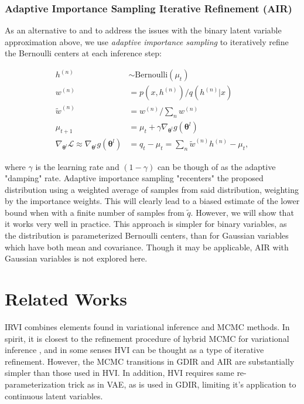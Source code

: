 \documentclass{article} %
\newcommand{\vects}[1]{\boldsymbol{#1}}
\newcommand{\TT}[0]{\vects{\theta}}
\newcommand{\grad}[0]{\nabla}
\newcommand{\LL}[0]{\mathcal{L}}
\newcommand{\Bernoulli}{\text{Bernoulli}}
\begin{document}
\subsubsection{Adaptive Importance Sampling Iterative Refinement (AIR)}
As an alternative to and to address the issues with the binary latent variable approximation above, we use \emph{adaptive importance sampling} \citep[AdIS,][]{karamchandani1989adaptive} to iteratively refine the Bernoulli centers at each inference step:

\begin{align}
    h^{(n)} &\sim \Bernoulli(\mu_t) \nonumber \\
w^{(n)} &= p(x, h^{(n)}) / q(h^{(n)} | x) \nonumber \\
\tilde{w}^{(n)} &= w^{(n)} / \sum_n w^{(n)} \nonumber \\
\mu_{t+1} &= \mu_t + \gamma \grad_{\TT^l} g(\TT^l) \nonumber\\
\grad_{\TT^l} \LL \approx \grad_{\TT^l} g(\TT^l) &= q_t - \mu_t  = \sum_n
    \tilde{w}^{(n)} h^{(n)} - \mu_t,
\end{align}

where $\gamma$ is the learning rate and $(1 - \gamma)$ can be though of as the adaptive "damping" rate. Adaptive importance sampling "recenters" the proposed distribution using a weighted average of samples from said distribution, weighting by the importance weights. This will clearly lead to a biased estimate of the lower bound when with a finite number of samples from $\tilde{q}$. However, we will show that it works very well in practice. This approach is simpler for binary variables, as the distribution is parameterized Bernoulli centers, than for Gaussian variables which have both mean and covariance. Though it may be applicable, AIR with Gaussian variables is not explored here.

\section{Related Works}
IRVI combines elements found in variational inference and MCMC methods. In
spirit, it is closest to the refinement procedure of hybrid MCMC for variational
inference \citep[HVI,][]{salimans2014markov}, and in some senses HVI can be thought as a type of iterative refinement. However, the MCMC transitions in GDIR and AIR are substantially simpler than those used in HVI. In addition, HVI
requires same re-parameterization trick as in VAE, as is used in GDIR, limiting it's application to continuous latent variables.
\end{document}
